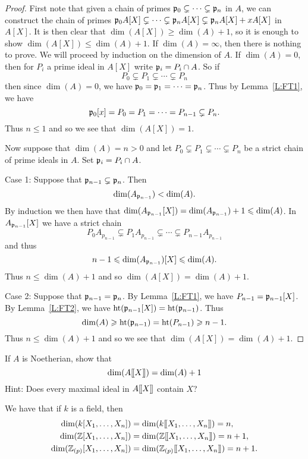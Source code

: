 \documentclass{ximera}
\begin{document}
\begin{proof} First note that given a chain of primes $\mathfrak{p}_0 \subsetneq \cdots \subsetneq \mathfrak{p}_n$ in $A$, we can construct the chain of primes $\mathfrak{p}_0 A[X] \subsetneq \cdots \subsetneq \mathfrak{p}_n A[X] \subsetneq \mathfrak{p}_n A[X] + x A[X]$ in $A[X]$.  It is then clear that $\dim(A[X]) \ge \dim(A) + 1$, so it is enough to show $\dim(A[X]) \le\dim(A) + 1$. If $\dim(A) = \infty$, then there is nothing to prove. We will proceed by induction on the dimension of $A$. If $\dim(A) = 0$, then for $P_i$ a prime ideal in $A[X]$ write $\mathfrak{p}_i = P_i\cap A$.  So if 
\[
P_0\subsetneq P_1\subsetneq \cdots \subsetneq P_n
\]
then since $\dim(A) = 0$, we have $\mathfrak{p}_0 = \mathfrak{p}_1 = \cdots = \mathfrak{p}_n$. Thus by Lemma~\ref{L:FT1}, we have 
\[
\mathfrak{p}_0[x] = P_0 = P_1 = \cdots = P_{n-1}\subsetneq P_n.
\]
Thus $n\le 1$ and so we see that $\dim(A[X]) = 1$.

Now suppose that $\dim(A) = n >0$ and let $P_0 \subsetneq P_1 \subsetneq \cdots \subsetneq P_n$ be a strict chain of prime ideals in $A$.  Set $\mathfrak{p}_i = P_i \cap A$.  

Case 1: Suppose that $\mathfrak{p}_{n-1} \subsetneq \mathfrak{p}_n$. Then
\[
\dim(A_{\mathfrak{p}_{n-1}})< \dim(A).
\]
By induction we then have that $\dim(A_{\mathfrak{p}_{n-1}}[X]) = \dim(A_{\mathfrak{p}_{n-1}})+1\leqslant \dim(A)$. In $A_{\mathfrak{p}_{n-1}}[X]$ we have a strict chain
\[
P_0A_{p_{n-1}} \subsetneq P_1A_{p_{n-1}} \subsetneq \cdots \subsetneq P_{n-1}A_{p_{n-1}}
\] 
and thus 
\[
n-1 \leqslant \dim(A_{\mathfrak{p}_{n-1}})[X]\leqslant \dim(A). 
\]
Thus $n \le\dim(A) +1$ and so  $\dim(A[X]) = \dim(A) + 1$.

Case 2: Suppose that $\mathfrak{p}_{n-1} = \mathfrak{p}_n$. By Lemma~\ref{L:FT1}, we have $P_{n-1} = \mathfrak{p}_{n-1}[X]$.  By Lemma~\ref{L:FT2}, we have $\operatorname{ht}(\mathfrak{p}_{n-1}[X])=\operatorname{ht}(\mathfrak{p}_{n-1})$.  Thus
\[
\dim(A) \geqslant \operatorname{ht}(\mathfrak{p}_{n-1}) = \operatorname{ht}(P_{n-1}) \geqslant n-1.
\]
Thus $n\le \dim(A) + 1$ and so we see that $\dim(A[X]) = \dim(A) +1$.
\end{proof}

\begin{exercise} If $A$ is Noetherian, show that 
\[
\dim(A[\hspace{-0.25ex}[ X ]\hspace{-0.25ex}]) = \dim(A) + 1
\]
Hint: Does every maximal ideal in $A[\hspace{-0.25ex}[ X ]\hspace{-0.25ex}]$ contain $X$?
\end{exercise}


\begin{corollary} We have that if $k$ is a field, then
\begin{align*}
\dim(k[X_1,\ldots,X_n]) &= \dim(k[\hspace{-0.25ex}[ X_1,\dots,X_n]\hspace{-0.25ex}]) = n, \\
\dim(\mathbb Z[X_1,\ldots,X_n]) &= \dim(\mathbb Z[\hspace{-0.25ex}[ X_1,\dots,X_n]\hspace{-0.25ex}]) = n+1, \\
\dim(\mathbb Z_{(p)}[X_1,\ldots,X_n]) &= \dim(\mathbb Z_{(p)}[\hspace{-0.25ex}[ X_1,\dots,X_n]\hspace{-0.25ex}]) = n+1.
\end{align*}
\end{corollary}
\end{document}
